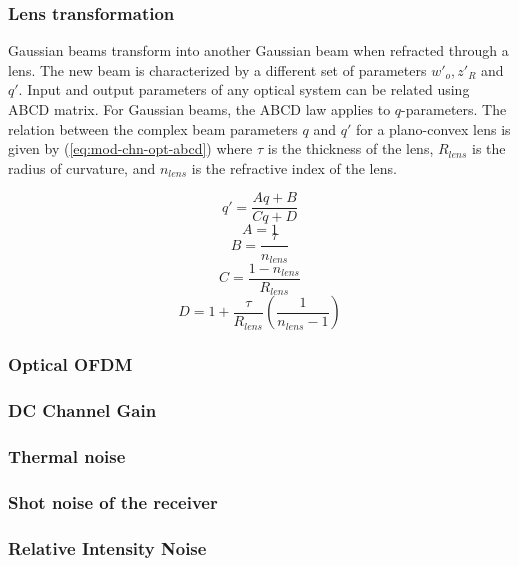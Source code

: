 \subsubsection{Lens transformation}
Gaussian beams transform into another Gaussian beam when refracted through a lens. The new beam is characterized by a different set of parameters $w'_o, z'_R$ and $q'$. Input and output parameters of any optical system can be related using ABCD matrix\cite{saleh_fundamentals_2019}. For Gaussian beams, the ABCD law applies to $q$-parameters. The relation between the  complex beam parameters $q$ and $q'$ for a plano-convex lens is given by (\ref{eq:mod-chn-opt-abcd})\cite{hecht_optics_2002} where $\tau$ is the thickness of the lens, $R_{lens}$ is the radius of curvature, and $n_{lens}$ is the refractive index of the lens.
\begin{subeqations}
    \begin{equation}
        q' = \frac{Aq + B}{Cq + D}
        \label{eq:mod-chn-opt-abcd} 
    \end{equation}
    \begin{equation}
        A = 1
    \end{equation}
    \begin{equation}
        B = \frac{\tau}{n_{lens}}
    \end{equation}
    \begin{equation}
        C = \frac{1 - n_{lens}}{R_{lens}}
    \end{equation}
    \begin{equation}
        D = 1 + \frac{\tau}{R_{lens}} \left(\frac{1}{n_{lens} - 1}\right)
    \end{equation}
\end{subeqations}
    

\subsubsection{Optical OFDM}
\subsubsection{DC Channel Gain}
\subsubsection{Thermal noise}
\subsubsection{Shot noise of the receiver}
\subsubsection{Relative Intensity Noise}
